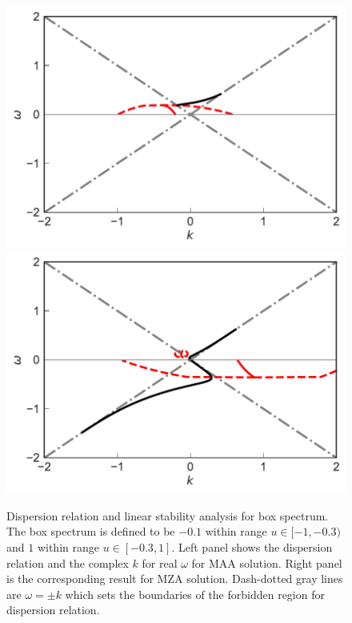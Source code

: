 \begin{figure}
   \includegraphics[width=\linewidth]{chapters/assets/dr/spectBoxC1MAADRPltBlob.pdf}
   \endminipage\hfill
   \includegraphics[width=\linewidth]{chapters/assets/dr/spectBoxC1MZADRPltBlob.pdf}
   \endminipage\hfill
   \caption{Dispersion relation and linear stability analysis for box spectrum. The box spectrum is defined to be $-0.1$ within range $u\in [-1,-0.3)$ and $1$ within range $u\in [-0.3,1]$. Left panel shows the dispersion relation and the complex $k$ for real $\omega$ for MAA solution. Right panel is the corresponding result for MZA solution. Dash-dotted gray lines are $\omega= \pm k$ which sets the boundaries of the forbidden region for dispersion relation.
    }
   \label{fig-box-c1}
\end{figure}





